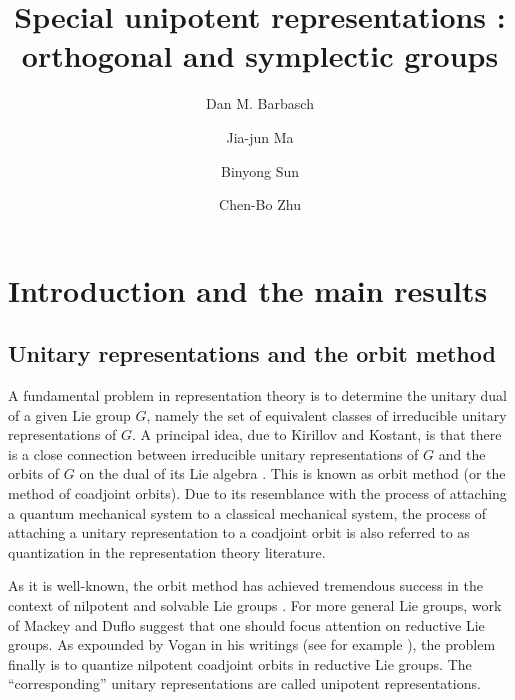 \documentclass[12pt,a4paper]{amsart}
\title[]{Special unipotent representations : orthogonal and symplectic groups}
\author [D. Barbasch] {Dan M. Barbasch}
\author [J.-J. Ma] {Jia-jun Ma}
\author [B. Sun] {Binyong Sun}
\author [C.-B. Zhu] {Chen-Bo Zhu}
\numberwithin{equation}{section}
\theoremstyle{remark}
\begin{document}
\maketitle


\tableofcontents


\section{Introduction and the main results}\label{sec:intro}

\subsection{Unitary representations and the orbit method}
A fundamental problem in representation theory is to determine the unitary dual
of a given Lie group $G$, namely the set of equivalent classes of irreducible
unitary representations of $G$. A principal idea, due to Kirillov and Kostant,
is that there is a close connection between irreducible unitary representations
of $G$ and the orbits of $G$ on the dual of its Lie algebra \cite{Ki62,Ko70}.
This is known as orbit method (or the method of coadjoint orbits). Due to its
resemblance with the process of attaching a quantum mechanical system to a
classical mechanical system, the process of attaching a unitary representation
to a coadjoint orbit is also referred to as quantization in the representation
theory literature.

As it is well-known, the orbit method has achieved tremendous success in the
context of nilpotent and solvable Lie groups \cite{Ki62,AK}. For more general
Lie groups, work of Mackey and Duflo \cite{Ma,Du82} suggest that one should
focus attention on reductive Lie groups. As expounded by Vogan in his writings
(see for example \cite{VoBook,Vo98,Vo00}), the problem finally is to quantize
nilpotent coadjoint orbits in reductive Lie groups. The ``corresponding''
unitary representations are called unipotent representations.
\end{document}
